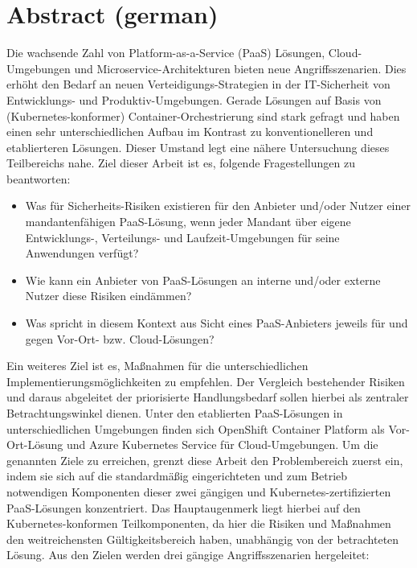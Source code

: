 \chapter*{Abstract (german)}
\thispagestyle{empty}

Die wachsende Zahl von Platform-as-a-Service (PaaS) Lösungen, Cloud-Umgebungen und Microservice-Architekturen bieten neue Angriffsszenarien.
Dies erhöht den Bedarf an neuen Verteidigungs-Strategien in der IT-Sicherheit von Entwicklungs- und Produktiv-Umgebungen.
Gerade Lösungen auf Basis von (Kubernetes-konformer) Container-Orchestrierung sind stark gefragt und haben einen sehr unterschiedlichen Aufbau im Kontrast zu konventionelleren und etablierteren Lösungen.
Dieser Umstand legt eine nähere Untersuchung dieses Teilbereichs nahe.
Ziel dieser Arbeit ist es, folgende Fragestellungen zu beantworten:

\begin{itemize}

\item Was für Sicherheits-Risiken existieren für den Anbieter und/oder Nutzer einer mandantenfähigen PaaS-Lösung, wenn jeder Mandant über eigene Entwicklungs-, Verteilungs- und Laufzeit-Umgebungen für seine Anwendungen verfügt?

\item Wie kann ein Anbieter von PaaS-Lösungen an interne und/oder externe Nutzer diese Risiken eindämmen?

\item Was spricht in diesem Kontext aus Sicht eines PaaS-Anbieters jeweils für und gegen Vor-Ort- bzw. Cloud-Lösungen?

\end{itemize}

Ein weiteres Ziel ist es, Maßnahmen für die unterschiedlichen Implementierungsmöglichkeiten zu empfehlen.
Der Vergleich bestehender Risiken und daraus abgeleitet der priorisierte Handlungsbedarf sollen hierbei als zentraler Betrachtungswinkel dienen.
Unter den etablierten PaaS-Lösungen in unterschiedlichen Umgebungen finden sich OpenShift Container Platform als Vor-Ort-Lösung und Azure Kubernetes Service für Cloud-Umgebungen.
Um die genannten Ziele zu erreichen, grenzt diese Arbeit den Problembereich zuerst ein, indem sie sich auf die standardmäßig eingerichteten und zum Betrieb notwendigen Komponenten dieser zwei gängigen und Kubernetes-zertifizierten PaaS-Lösungen konzentriert.
Das Hauptaugenmerk liegt hierbei auf den Kubernetes-konformen Teilkomponenten, da hier die Risiken und Maßnahmen den weitreichensten Gültigkeitsbereich haben, unabhängig von der betrachteten Lösung.
Aus den Zielen werden drei gängige Angriffsszenarien hergeleitet: 

